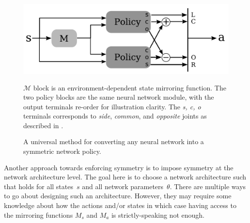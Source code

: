 \begin{figure}%
  \centering
  \includegraphics[width=0.9\columnwidth]{symmetry_figures/net_architecture_2.pdf}
  \caption{A universal method for converting any neural network into a symmetric network policy.}{$\mathcal{M}$ block is an environment-dependent state mirroring function. The two policy blocks are the same neural network module, with the output terminals re-order for illustration clarity.  The \textit{s, c, o} terminals corresponds to \textit{side}, \textit{common}, and \textit{opposite} joints as described in .}
  \label{fig:net-architecture}
\end{figure}

Another approach towards enforcing symmetry is to impose symmetry at the network architecture level. 
The goal here is to choose a network architecture such that  
holds for all states~$s$ and all network parameters~$\theta$.
There are multiple ways to go about designing such an architecture.
However, they may require some knowledge about how the actions and/or states 
in which case having access to the mirroring functions $M_s$ and $M_a$ is strictly-speaking not enough.


